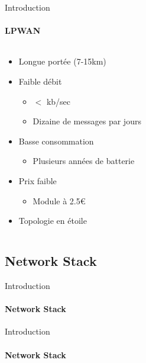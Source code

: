 \begin{frame}{Introduction}
\framesubtitle{LPWAN}
\begin{columns}
  \begin{column}{0.5\textwidth}
  \begin{itemize}
    \item Longue portée (7-15km)
    \item Faible débit
    \begin{itemize}
      \item $<$ kb/sec
      \item Dizaine de messages par jours
    \end{itemize}
    \item Basse consommation
    \begin{itemize}
      \item Plusieurs années de batterie
    \end{itemize}
    \item Prix faible
    \begin{itemize}
      \item Module à 2.5€
    \end{itemize}
    \item Topologie en étoile
  \end{itemize}
  \end{column}
  \begin{column}{0.5\textwidth}
      
  \end{column}
\end{columns}
\end{frame}

\subsection{Network Stack}

\begin{frame}{Introduction}
\framesubtitle{Network Stack}

\end{frame}

\begin{frame}{Introduction}
\framesubtitle{Network Stack}

\end{frame}
